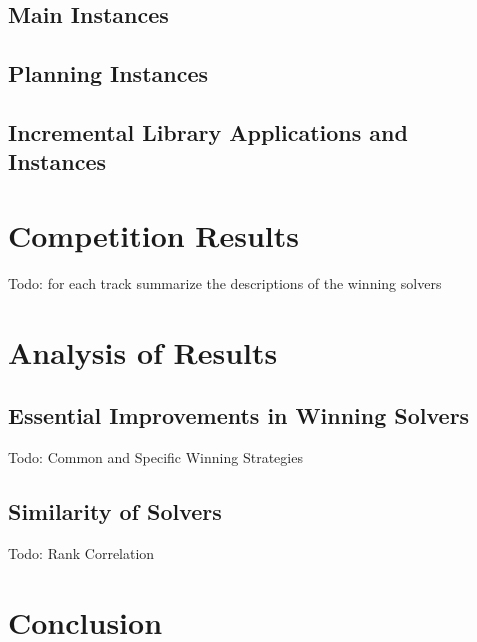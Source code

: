 \documentclass{elsarticle}
\newcommand{\todo}[1]{{\color{purple}Todo: #1}}
\begin{document}
\subsection{Main Instances}

\subsection{Planning Instances}

\subsection{Incremental Library Applications and Instances}


\section{Competition Results}

\todo{for each track summarize the descriptions of the winning solvers}


\section{Analysis of Results}

\subsection{Essential Improvements in Winning Solvers}

\todo{Common and Specific Winning Strategies}

\subsection{Similarity of Solvers}

\todo{Rank Correlation}


\section{Conclusion}





\end{document}
